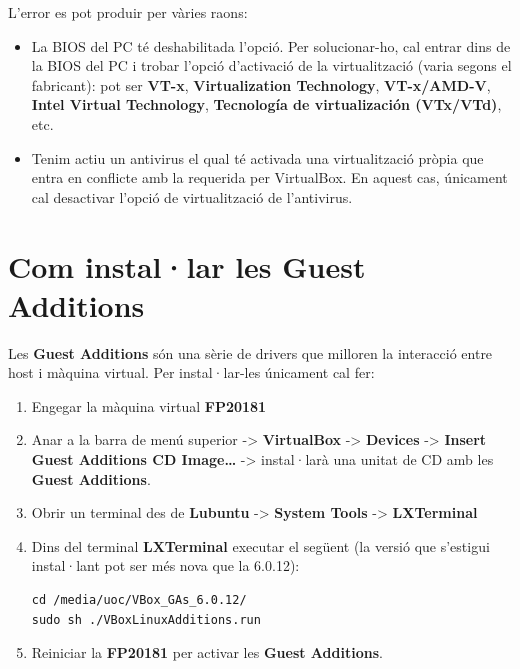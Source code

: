 \documentclass[]{book}
\providecommand{\tightlist}{%
  \setlength{\itemsep}{0pt}\setlength{\parskip}{0pt}}
\begin{document}
L'error es pot produir per vàries raons:

\begin{itemize}
\tightlist
\item
  La BIOS del PC té deshabilitada l'opció. Per solucionar-ho, cal entrar
  dins de la BIOS del PC i trobar l'opció d'activació de la
  virtualització (varia segons el fabricant): pot ser \textbf{VT-x},
  \textbf{Virtualization Technology}, \textbf{VT-x/AMD-V}, \textbf{Intel
  Virtual Technology}, \textbf{Tecnología de virtualización (VTx/VTd)},
  etc.
\item
  Tenim actiu un antivirus el qual té activada una virtualització pròpia
  que entra en conflicte amb la requerida per VirtualBox. En aquest cas,
  únicament cal desactivar l'opció de virtualització de l'antivirus.
\end{itemize}

\section{Com instal·lar les Guest
Additions}\label{com-installar-les-guest-additions}

Les \textbf{Guest Additions} són una sèrie de drivers que milloren la
interacció entre host i màquina virtual. Per instal·lar-les únicament
cal fer:

\begin{enumerate}
\def\labelenumi{\arabic{enumi}.}
\item
  Engegar la màquina virtual \textbf{FP20181}
\item
  Anar a la barra de menú superior -\textgreater{} \textbf{VirtualBox}
  -\textgreater{} \textbf{Devices} -\textgreater{} \textbf{Insert Guest
  Additions CD Image\ldots{}} -\textgreater{} instal·larà una unitat de
  CD amb les \textbf{Guest Additions}.
\item
  Obrir un terminal des de \textbf{Lubuntu} -\textgreater{}
  \textbf{System Tools} -\textgreater{} \textbf{LXTerminal}
\item
  Dins del terminal \textbf{LXTerminal} executar el següent (la versió
  que s'estigui instal·lant pot ser més nova que la 6.0.12):

\begin{verbatim}
cd /media/uoc/VBox_GAs_6.0.12/     
sudo sh ./VBoxLinuxAdditions.run
\end{verbatim}
\item
  Reiniciar la \textbf{FP20181} per activar les \textbf{Guest
  Additions}.
\end{enumerate}
\end{document}
